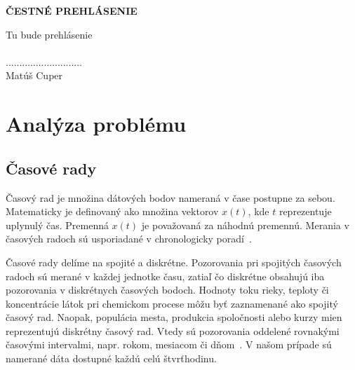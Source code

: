 \documentclass[a4paper,slovak,12pt,appendix]{article}
\begin{document}
\newpage
\thispagestyle{plain}
\vspace*{15cm}
\begin{large}
  \noindent \textbf{ČESTNÉ PREHLÁSENIE} \\
\end{large}
\noindent
Tu bude prehlásenie \\
\vspace*{0.5cm}\\
\hspace*{10cm}............................\\
\hspace*{10.7cm} Matúš Cuper


\newpage
\tableofcontents


\newpage
\section{Analýza problému}


\subsection{Časové rady}
Časový rad je množina dátových bodov nameraná v čase postupne za sebou.
Matematicky je definovaný ako množina vektorov $x(t)$, kde $t$ reprezentuje
uplynulý čas. Premenná $x(t)$ je považovaná za náhodnú premennú.
Merania v časových radoch sú usporiadané v chronologicky
poradí~\cite{Agrawal2013}.

Časové rady delíme na spojité a diskrétne. Pozorovania pri spojitých časových
radoch sú merané v každej jednotke času, zatiaľ čo diskrétne obsahujú iba
pozorovania v diskrétnych časových bodoch. Hodnoty toku rieky, teploty
či koncentrácie látok pri chemickom procese môžu byť zaznamenané ako spojitý
časový rad. Naopak, populácia mesta, produkcia spoločnosti alebo kurzy mien
reprezentujú diskrétny časový rad. Vtedy sú pozorovania oddelené rovnakými
časovými intervalmi, napr. rokom, mesiacom či dňom~\cite{Agrawal2013}. V našom
prípade sú namerané dáta dostupné každú celú štvrťhodinu.
\end{document}
